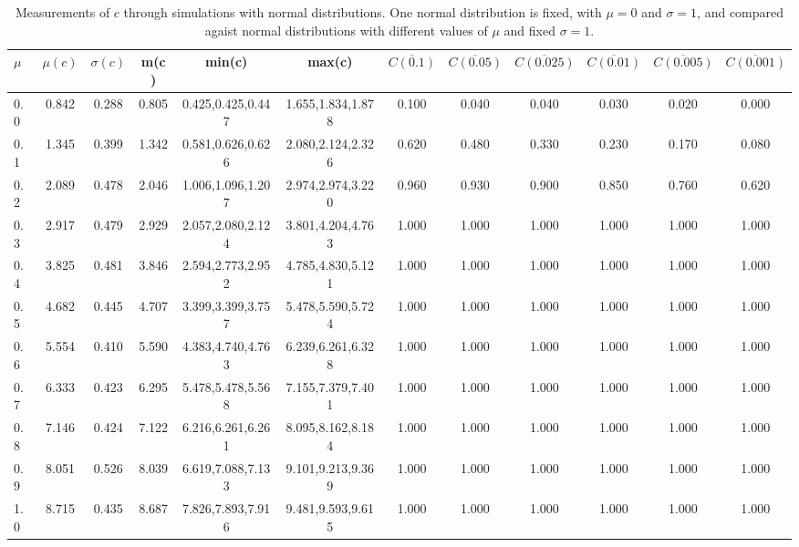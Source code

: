 \begin{table*}[h!]
\begin{center}
\begin{tabular}{| l | c | c | c | c | c | c | c | c | c | c | c |}\hline
$\mu$ & $\mu(c)$ & $\sigma(c)$ & m(c) & min(c) & max(c) & $\overline{C(0.1)}$ & $\overline{C(0.05)}$ & $\overline{C(0.025)}$ & $\overline{C(0.01)}$ & $\overline{C(0.005)}$ & $\overline{C(0.001)}$ \\\hline
0.0 & 0.842 & 0.288 & 0.805 & 0.425,0.425,0.447 & 1.655,1.834,1.878  & 0.100  & 0.040  & 0.040  & 0.030  & 0.020  & 0.000 \\\hline
0.1 & 1.345 & 0.399 & 1.342 & 0.581,0.626,0.626 & 2.080,2.124,2.326  & 0.620  & 0.480  & 0.330  & 0.230  & 0.170  & 0.080 \\\hline
0.2 & 2.089 & 0.478 & 2.046 & 1.006,1.096,1.207 & 2.974,2.974,3.220  & 0.960  & 0.930  & 0.900  & 0.850  & 0.760  & 0.620 \\\hline
0.3 & 2.917 & 0.479 & 2.929 & 2.057,2.080,2.124 & 3.801,4.204,4.763  & 1.000  & 1.000  & 1.000  & 1.000  & 1.000  & 1.000 \\\hline
0.4 & 3.825 & 0.481 & 3.846 & 2.594,2.773,2.952 & 4.785,4.830,5.121  & 1.000  & 1.000  & 1.000  & 1.000  & 1.000  & 1.000 \\\hline
0.5 & 4.682 & 0.445 & 4.707 & 3.399,3.399,3.757 & 5.478,5.590,5.724  & 1.000  & 1.000  & 1.000  & 1.000  & 1.000  & 1.000 \\\hline
0.6 & 5.554 & 0.410 & 5.590 & 4.383,4.740,4.763 & 6.239,6.261,6.328  & 1.000  & 1.000  & 1.000  & 1.000  & 1.000  & 1.000 \\\hline
0.7 & 6.333 & 0.423 & 6.295 & 5.478,5.478,5.568 & 7.155,7.379,7.401  & 1.000  & 1.000  & 1.000  & 1.000  & 1.000  & 1.000 \\\hline
0.8 & 7.146 & 0.424 & 7.122 & 6.216,6.261,6.261 & 8.095,8.162,8.184  & 1.000  & 1.000  & 1.000  & 1.000  & 1.000  & 1.000 \\\hline
0.9 & 8.051 & 0.526 & 8.039 & 6.619,7.088,7.133 & 9.101,9.213,9.369  & 1.000  & 1.000  & 1.000  & 1.000  & 1.000  & 1.000 \\\hline
1.0 & 8.715 & 0.435 & 8.687 & 7.826,7.893,7.916 & 9.481,9.593,9.615  & 1.000  & 1.000  & 1.000  & 1.000  & 1.000  & 1.000 \\\hline
\end{tabular}
\caption{Measurements of $c$ through simulations
with normal distributions.
One normal distribution is fixed, with $\mu=0$ and $\sigma=1$,
and compared agaist normal distributions with different values of $\mu$ and fixed $\sigma=1$.}
\end{center}
\end{table*}